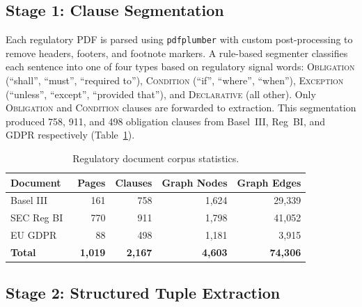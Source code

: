 \documentclass{article}
\begin{document}
\subsection{Stage 1: Clause Segmentation}

Each regulatory PDF is parsed using \texttt{pdfplumber} with custom
post-processing to remove headers, footers, and footnote markers.
A rule-based segmenter classifies each sentence into one of four types
based on regulatory signal words: \textsc{Obligation} (``shall'',
``must'', ``required to''), \textsc{Condition} (``if'', ``where'',
``when''), \textsc{Exception} (``unless'', ``except'', ``provided
that''), and \textsc{Declarative} (all other).
Only \textsc{Obligation} and \textsc{Condition} clauses are forwarded
to extraction.
This segmentation produced 758, 911, and 498 obligation clauses from
Basel~III, Reg~BI, and GDPR respectively (Table~\ref{tab:corpus}).

\begin{table}[!htbp]
\caption{Regulatory document corpus statistics.}
\centering
\begin{tabular}{lrrrr}
\toprule
Document & Pages & Clauses & Graph Nodes & Graph Edges \\
\midrule
Basel III~\cite{bis2017}  & 161   & \phantom{0,}758 & 1,624 & 29,339 \\
SEC Reg BI~\cite{sec2019} & 770   & \phantom{0,}911 & 1,798 & 41,052 \\
EU GDPR~\cite{gdpr2016}   & \phantom{0}88 & \phantom{0,}498 & 1,181 & \phantom{0}3,915 \\
\midrule
\textbf{Total} & \textbf{1,019} & \textbf{2,167} & \textbf{4,603} & \textbf{74,306} \\
\bottomrule
\end{tabular}
\label{tab:corpus}
\end{table}

\subsection{Stage 2: Structured Tuple Extraction}
\end{document}
